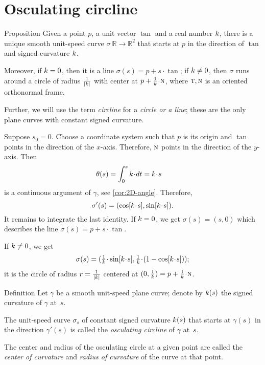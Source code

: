 \section{Osculating circline}

\begin{thm}{Proposition}\label{prop:circline}
Given a point $p$,
a unit vector $\tan$ 
and a real number $k$, there is a unique smooth unit-speed curve $\sigma\:\mathbb{R}\to\mathbb{R}^2$ 
that starts at $p$ in the direction of $\tan$ and signed curvature $k$.

Moreover, if $k=0$, then it is a line $\sigma(s)=p+s\cdot \tan$;
if $k\ne 0$, then $\sigma$ runs around a circle of radius $\tfrac1{|k|}$ with center at $p+\tfrac1\skur\cdot \norm$, where $\text{\sc{t}},\text{\sc{n}}$ is an oriented orthonormal frame.
\end{thm}

Further, we will use the term \emph{circline} for a \textit{circle or a line};
these are the only plane curves with constant signed curvature.

Suppose $s_0=0$.
Choose a coordinate system such that $p$ is its origin and $\tan$ points in the direction of the $x$-axis.
Therefore, $\text{\sc{n}}$ points in the direction of the $y$-axis.
Then
\begin{align*}\theta(s)&=\int_{0}^s\skur\cdot dt=\skur\cdot s
\end{align*}
is a continuous argument of $\gamma$, see \ref{cor:2D-angle}.
Therefore,
\[\sigma'(s)=(\cos[\skur\cdot s],\sin[\skur\cdot s]).\]
It remains to integrate the last identity.
If $k=0$, we get $\sigma(s)=(s,0)$
which describes the line $\sigma(s)=p+s\cdot \tan$.

If $k\ne 0$, we get
\[\sigma(s)=(\tfrac1\skur\cdot\sin[\skur\cdot s],
\tfrac1\skur\cdot(1-\cos[\skur\cdot s]));\]
it is the circle of radius $r=\tfrac1{|k|}$ centered at $(0,\tfrac1\skur)=p+\tfrac1\skur\cdot\norm$.
\qeds

\begin{thm}{Definition}
Let $\gamma$ be a smooth unit-speed plane curve;
denote by $k(s)$ the signed curvature of $\gamma$ at~$s$.

The unit-speed curve $\sigma_s$ of constant signed curvature $k(s)$ that starts at $\gamma(s)$ in the direction $\gamma'(s)$ is called the \emph{osculating circline} of $\gamma$ at~$s$.

The center and radius of the osculating circle at a given point are called the \emph{center of curvature} and \emph{radius of curvature} of the curve at that point.
\end{thm}

